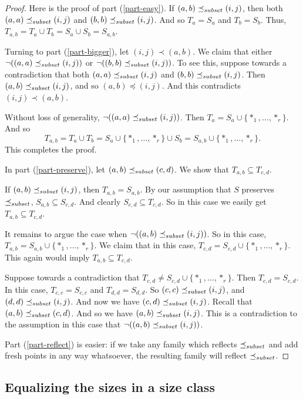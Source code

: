 \documentclass[12pt]{article}
\theoremstyle{definition}
\newcommand{\set}[1]{\{ #1 \}}
\newcommand{\nott}{\neg}
\newcommand{\precsubseteq}{\preceq_{\scriptsize subset}}
\begin{document}
\begin{proof}
Here is the proof of part (\ref{part-easy}).
If $(a,b)\precsubseteq (i,j)$, then both $(a,a)\precsubseteq (i,j)$ and $(b,b)\precsubseteq (i,j)$.
And so $T_a = S_a$ and $T_b = S_b$.
 Thus, $T_{a,b} = T_a \cup T_b = S_a \cup S_b = S_{a,b}$.
 
 Turning to part (\ref{part-bigger}), let  $(i,j) \prec (a,b)$.
 We claim that either $\nott ((a,a) \precsubseteq (i,j))$ or $\nott ((b,b) \precsubseteq (i,j))$.
To see this, suppose towards a contradiction that both $(a,a) \precsubseteq(i,j)$ and $(b,b) \precsubseteq (i,j)$.
 Then $(a,b) \precsubseteq (i,j)$, and so $(a,b) \preceq (i,j)$.  And this contradicts 
$(i,j) \prec (a,b)$.

Without loss of generality, 
$\nott ((a,a) \precsubseteq (i,j))$.
Then $T_a = S_a \cup \set{*_1,\ldots, *_r}$.
And so
\[ T_{a,b} = T_a \cup T_b = S_a\cup\set{*_1,\ldots, *_r} \cup S_b = S_{a,b}\cup\set{*_1,\ldots, *_r}.\]
This completes the proof.


In  part (\ref{part-preserve}),
let $(a,b) \precsubseteq (c,d)$.  We show that $T_{a,b} \subseteq T_{c,d}$.

If $(a,b)\precsubseteq (i,j)$, then $T_{a,b} = S_{a,b}$.
By our assumption that $S$ preserves $\precsubseteq$, $S_{a,b} \subseteq S_{c,d}$.
And clearly $S_{c,d} \subseteq T_{c,d}$.
So in this case we easily get $T_{a,b} \subseteq T_{c,d}$.

It remains to argue the case when
$\nott((a,b)\precsubseteq (i,j))$.
So in this case,  
$T_{a,b} =  S_{a,b} \cup \set{*_1,\ldots, *_r}$.
We claim that in this case,
$T_{c,d} =  S_{c,d} \cup \set{*_1,\ldots, *_r}$.
This again would imply $T_{a,b} \subseteq T_{c,d}$.

Suppose towards a contradiction that 
$T_{c,d} \neq  S_{c,d} \cup \set{*_1,\ldots, *_r}$.
Then $T_{c,d} =  S_{c,d} $.
In this case, $T_{c,c} = S_{c,c}$ and $T_{d,d} = S_{d,d}$.
So  $(c,c)\precsubseteq (i,j)$,
and   $(d,d)\precsubseteq (i,j)$.
And now we have   $(c,d)\precsubseteq (i,j)$.
Recall that 
$(a,b) \precsubseteq (c,d)$. 
And so we have $(a,b) \precsubseteq (i,j)$. 
This is a contradiction to the assumption in this case that 
$\nott((a,b)\precsubseteq (i,j))$.

Part (\ref{part-reflect}) is easier:  if we take any family which reflects $\precsubseteq$ and
add fresh points in any way whatsoever, the resulting family will reflect $\precsubseteq$.
\end{proof}

\subsection{Equalizing the sizes in a size class}
\end{document}
